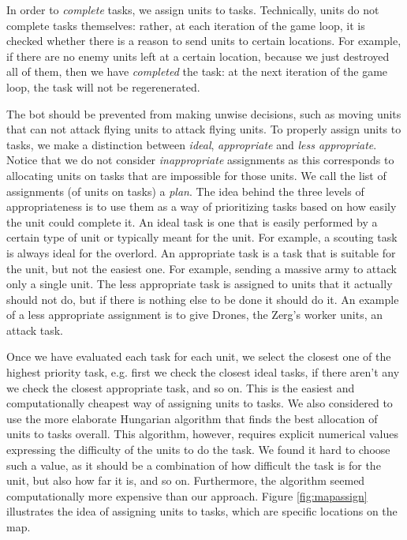 In order to \emph{complete} tasks, we assign units to tasks. Technically, units do not complete tasks themselves: rather, at each iteration of the game loop, it is checked whether there is a reason to send units to certain locations. For example, if there are no enemy units left at a certain location, because we just destroyed all of them, then we have \emph{completed} the task: at the next iteration of the game loop, the task will not be regerenerated.

The bot should be prevented from making unwise decisions, such as moving units that can not attack flying units to attack flying units. To properly assign units to tasks, we make a distinction between \emph{ideal}, \emph{appropriate} and \emph{less appropriate}. Notice that we do not consider \emph{inappropriate} assignments as this corresponds to allocating units on tasks that are impossible for those units. We call the list of assignments (of units on tasks) a \emph{plan}. The idea behind the three levels of appropriateness is to use them as a way of prioritizing tasks based on how easily the unit could complete it. An ideal task is one that is easily performed by a certain type of unit or typically meant for the unit. For example, a scouting task is always ideal for the overlord. An appropriate task is a task that is suitable for the unit, but not the easiest one. For example, sending a massive army to attack only a single unit. The less appropriate task is assigned to units that it actually should not do, but if there is nothing else to be done it should do it. An example of a less appropriate assignment is to give Drones, the Zerg's worker units, an attack task.

Once we have evaluated each task for each unit, we select the closest one of the highest priority task, e.g. first we check the closest ideal tasks, if there aren't any we check the closest appropriate task, and so on. This is the easiest and computationally cheapest way of assigning units to tasks. We also considered to use the more elaborate Hungarian algorithm that finds the best allocation of units to tasks overall. This algorithm, however, requires explicit numerical values expressing the difficulty of the units to do the task. We found it hard to choose such a value, as it should be a combination of how difficult the task is for the unit, but also how far it is, and so on. Furthermore, the algorithm seemed computationally more expensive than our approach. Figure \ref{fig:mapassign} illustrates the idea of assigning units to tasks, which are specific locations on the map.

